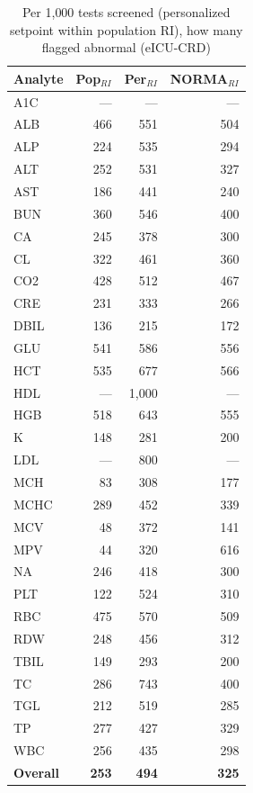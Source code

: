 \begin{table}[ht]
\centering
\footnotesize
\caption{Per 1{,}000 tests screened (personalized setpoint within population RI), how many flagged abnormal (eICU-CRD)}
\begin{tabular}{lrrr}
\toprule
Analyte & Pop$_{RI}$ & Per$_{RI}$ & NORMA$_{RI}$ \\
\midrule
A1C & --- & --- & --- \\
ALB & 466 & 551 & 504 \\
ALP & 224 & 535 & 294 \\
ALT & 252 & 531 & 327 \\
AST & 186 & 441 & 240 \\
BUN & 360 & 546 & 400 \\
CA & 245 & 378 & 300 \\
CL & 322 & 461 & 360 \\
CO2 & 428 & 512 & 467 \\
CRE & 231 & 333 & 266 \\
DBIL & 136 & 215 & 172 \\
GLU & 541 & 586 & 556 \\
HCT & 535 & 677 & 566 \\
HDL & --- & 1,000 & --- \\
HGB & 518 & 643 & 555 \\
K & 148 & 281 & 200 \\
LDL & --- & 800 & --- \\
MCH & 83 & 308 & 177 \\
MCHC & 289 & 452 & 339 \\
MCV & 48 & 372 & 141 \\
MPV & 44 & 320 & 616 \\
NA & 246 & 418 & 300 \\
PLT & 122 & 524 & 310 \\
RBC & 475 & 570 & 509 \\
RDW & 248 & 456 & 312 \\
TBIL & 149 & 293 & 200 \\
TC & 286 & 743 & 400 \\
TGL & 212 & 519 & 285 \\
TP & 277 & 427 & 329 \\
WBC & 256 & 435 & 298 \\
\midrule
\textbf{Overall} & \textbf{253} & \textbf{494} & \textbf{325} \\
\bottomrule
\end{tabular}
\end{table}